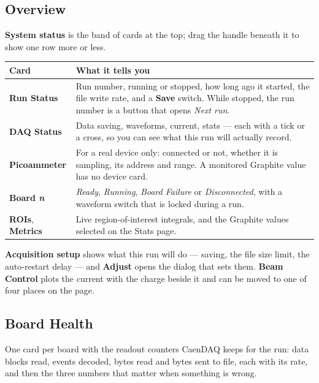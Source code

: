 \documentclass[11pt,a4paper]{report}
\newcommand{\ui}[1]{\textbf{#1}}          %
\begin{document}
\subsection{Overview}

\ui{System status} is the band of cards at the top; drag the handle beneath it to
show one row more or less.

\begin{center}
\begin{tabular}{@{}L{0.24\textwidth}L{0.68\textwidth}@{}}
\toprule
\textbf{Card} & \textbf{What it tells you} \\
\midrule
\ui{Run Status} & Run number, running or stopped, how long ago it started, the
file write rate, and a \ui{Save} switch. While stopped, the run number is a
button that opens \emph{Next run}. \\
\ui{DAQ Status} & Data saving, waveforms, current, stats --- each with a tick or a
cross, so you can see what this run will actually record. \\
\ui{Picoammeter} & For a real device only: connected or not, whether it is
sampling, its address and range. A monitored Graphite value has no device card. \\
\ui{Board \emph{n}} & \emph{Ready}, \emph{Running}, \emph{Board Failure} or
\emph{Disconnected}, with a waveform switch that is locked during a run. \\
\ui{ROIs}, \ui{Metrics} & Live region-of-interest integrals, and the Graphite
values selected on the Stats page. \\
\bottomrule
\end{tabular}
\end{center}

\ui{Acquisition setup} shows what this run will do --- saving, the file size
limit, the auto-restart delay --- and \ui{Adjust} opens the dialog that sets them.
\ui{Beam Control} plots the current with the charge beside it and can be moved to
one of four places on the page.

\subsection{Board Health}

One card per board with the readout counters CaenDAQ keeps for the run: data
blocks read, events decoded, bytes read and bytes sent to file, each with its
rate, and then the three numbers that matter when something is wrong.
\end{document}

